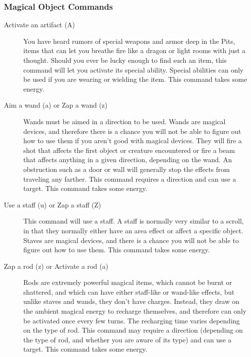 \subsubsection{Magical Object Commands} 
\begin{description}
\item[Activate an artifact (A)]
  You have heard rumors of special weapons and armor deep in the Pits,
  items that can let you breathe fire like a dragon or light rooms with
  just a thought. Should you ever be lucky enough to find such an item,
  this command will let you activate its special ability. Special
  abilities can only be used if you are wearing or wielding the item. This
  command takes some energy.

\item[Aim a wand (a) or Zap a wand (z)] Wands must be aimed in a direction
  to be used. Wands are magical devices, and therefore there is a chance
  you will not be able to figure out how to use them if you aren't good
  with magical devices. They will fire a shot that affects the first
  object or creature encountered or fire a beam that affects anything in a
  given direction, depending on the wand. An obstruction such as a door or
  wall will generally stop the effects from traveling any farther. This
  command requires a direction and can use a target.  This command takes
  some energy.

\item[Use a staff (u) or Zap a staff (Z)]
  This command will use a staff. A staff is normally very similar to a
  scroll, in that they normally either have an area effect or affect a
  specific object. Staves are magical devices, and there is a chance you
  will not be able to figure out how to use them.  This command takes some
  energy.
 
\item[Zap a rod (z) or Activate a rod (a)]
  Rods are extremely powerful magical items, which cannot be burnt or
  shattered, and which can have either staff-like or wand-like effects,
  but unlike staves and wands, they don't have charges.  Instead, they
  draw on the ambient magical energy to recharge themselves, and therefore
  can only be activated once every few turns. The recharging time varies
  depending on the type of rod.  This command may require a direction
  (depending on the type of rod, and whether you are aware of its type)
  and can use a target.  This command takes some energy.
\end{description}

